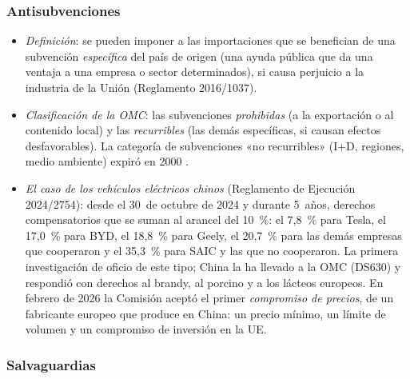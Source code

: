 \documentclass[11pt]{article}
\begin{document}
\subsubsection{Antisubvenciones}\label{sec:antisubvenciones}

\begin{itemize}
\item \emph{Definición}: se pueden imponer  a las importaciones que se benefician de una subvención \emph{específica} del país de origen (una ayuda pública que da una ventaja a una empresa o sector determinados), si causa perjuicio a la industria de la Unión (Reglamento 2016/1037)\nocite{UE2016Antisubvenciones}.
\item \emph{Clasificación de la OMC}: las subvenciones \emph{prohibidas} (a la exportación o al contenido local) y las \emph{recurribles} (las demás específicas, si causan efectos desfavorables). La categoría de subvenciones «no recurribles» (I+D, regiones, medio ambiente) expiró en 2000 .
\item \emph{El caso de los vehículos eléctricos chinos} (Reglamento de Ejecución 2024/2754)\nocite{CE2024VehiculosElectricos}: desde el 30~de octubre de 2024 y durante 5~años, derechos compensatorios que se suman al arancel del 10~\%: el 7,8~\% para Tesla, el 17,0~\% para BYD, el 18,8~\% para Geely, el 20,7~\% para las demás empresas que cooperaron y el 35,3~\% para SAIC y las que no cooperaron. La primera investigación de oficio de este tipo; China la ha llevado a la OMC (DS630) y respondió con derechos al brandy, al porcino y a los lácteos europeos. En febrero de 2026 la Comisión aceptó el primer \emph{compromiso de precios}, de un fabricante europeo que produce en China: un precio mínimo, un límite de volumen y un compromiso de inversión en la UE.
\end{itemize}

\subsubsection{Salvaguardias}\label{sec:salvaguardias}
\end{document}

